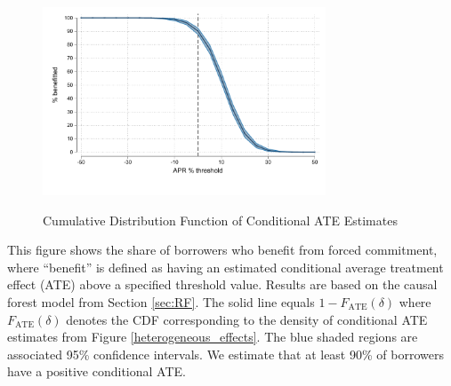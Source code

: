 \documentclass[oneside,11pt]{article}
\begin{document}
\cleardoublepage

\begin{figure}[H]
    \centering
  \caption{Cumulative Distribution Function of Conditional ATE Estimates}
  \includegraphics[width=0.75\textwidth]{Figuras/cdf_CATE.pdf} 
    \label{fig:CATEsurvival}
\end{figure}
 
This figure shows the share of borrowers who benefit from forced commitment, where ``benefit'' is defined as having an estimated conditional average treatment effect (ATE) above a specified threshold value. Results are based on the causal forest model from Section \ref{sec:RF}. The solid line equals $1 - F_\text{ATE}(\delta)$ where $F_\text{ATE}(\delta)$ denotes the CDF corresponding to the density of conditional ATE estimates from Figure \ref{heterogeneous_effects}. The blue shaded regions are associated 95\% confidence intervals. We estimate that at least 90\% of borrowers have a positive conditional ATE. 

  
\cleardoublepage
\end{document}

